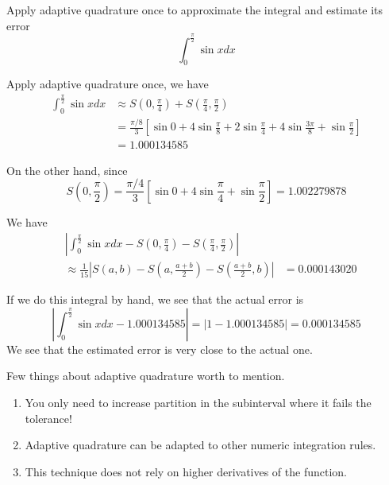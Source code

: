 \begin{ex}
	Apply adaptive quadrature once to approximate the integral and estimate its error
	\[ \int_0^{\frac{\pi}{2}} \sin xdx \]
	\begin{solution}
		Apply adaptive quadrature once, we have
		\begin{align*}
		\int_0^{\frac{\pi}{2}} \sin xdx 
		&\approx S\left(0,\frac{\pi}{4}\right) + S\left(\frac{\pi}{4}, \frac{\pi}{2}\right)\\
		&= \frac{\pi/8}{3}\left[ \sin 0  + 4\sin \frac{\pi}{8} + 2\sin \frac{\pi}{4} + 4\sin \frac{3\pi}{8} + \sin\frac{\pi}{2} \right]\\
		&= 1.000134585
		\end{align*}
		
		On the other hand, since
		\[ S\left(0,\frac{\pi}{2}\right) = \frac{\pi/4}{3}\left[ \sin 0 + 4\sin \frac{\pi}{4} + \sin\frac{\pi}{2} \right] = 1.002279878 \]
		
		We have 
		\begin{align*}
		&\left|\int_0^{\frac{\pi}{2}}\sin xdx - S\left(0,\frac{\pi}{4}\right) - S\left(\frac{\pi}{4}, \frac{\pi}{2}\right)\right| \\
		&\approx 
		\frac{1}{15}\left|S(a,b) - S\left(a,\frac{a+b}{2}\right) - S\left(\frac{a+b}{2}, b\right)\right|
		&= 0.000143020
		\end{align*}
		
		If we do this integral by hand, we see that the actual error is 
		\[ \left| \int_0^{\frac{\pi}{2}}\sin xdx - 1.000134585 \right| = \left| 1 - 1.000134585 \right| = 0.000134585 \]
		We see that the estimated error is very close to the actual one.
	\end{solution}
\end{ex}


\begin{summary}
	Few things about  adaptive quadrature worth to mention.
	\begin{enumerate}
		\item You only need to increase partition in the subinterval where it fails the tolerance! 
		\item Adaptive quadrature can be adapted to other numeric integration rules.
		\item This technique does not rely on higher derivatives of the function.
	\end{enumerate}
\end{summary}

